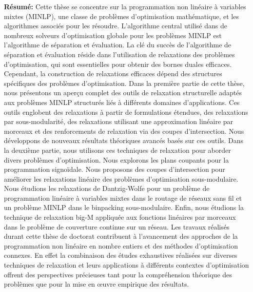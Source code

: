 {{\begin{center}
{{%
\begin{multicols}{2}
{\bf Résumé:} 
Cette thèse se concentre sur la programmation non linéaire à variables mixtes (MINLP), une classe de problèmes d'optimisation mathématique, et les algorithmes associés pour les résoudre. L'algorithme central utilisé dans de nombreux solveurs d'optimisation globale pour les problèmes MINLP est l'algorithme  de séparation et évaluation. La clé du succès de l'algorithme  de séparation et évaluation réside dans l'utilisation de relaxations des problèmes d'optimisation, qui sont essentielles pour obtenir des bornes duales efficaces.
Cependant, la construction de relaxations efficaces dépend des structures spécifiques des problèmes d'optimisation. Dans la première partie de cette thèse, nous présentons un aperçu complet des outils de relaxation structurelle adaptés aux problèmes MINLP structurés liés à
différents domaines d’applications. Ces outils englobent des relaxations à partir de formulations étendues, des relaxations par sous-modularité, des relaxations utilisant une approximation linéaire par morceaux et des renforcements de relaxation via des coupes d'intersection. Nous développons de nouveaux résultats théoriques avancés basés sur ces outils. Dans la deuxième partie, nous utilisons ces techniques de relaxation pour aborder divers problèmes d'optimisation. Nous explorons les plans coupants pour la programmation signoïdale. Nous proposons des coupes d'intersection pour améliorer les relaxations  linéaire des problèmes d'optimisation sous-modulaire.
Nous étudions les relaxations de Dantzig-Wolfe pour un problème de programmation linéaire à variables mixtes dans le routage de réseaux sans fil et un problème MINLP dans le binpacking sous-modulaire. Enfin, nous étudions la technique de relaxation big-M appliquée aux fonctions linéaires par morceaux dans le problème de couverture continue sur un réseau. 
Les travaux réalisés durant cette thèse de doctorat contribuent à l’avancement des approches de la programmation non linéaire en nombre entiers et des méthodes d’optimisation connexes.
En effet la combinaison des études exhaustives réalisées sur diverses techniques de relaxation et leurs applications à différents contextes d’optimisation offrent des perspectives précieuses tant pour la compréhension théorique des problèmes que pour la mise en œuvre empirique des résultats.
\end{multicols}
}}
\end{center}

\vspace*{0mm}

}}
